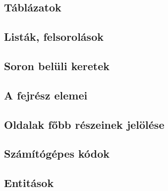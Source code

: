\documentclass[usenames,dvipsnames,aspectratio=169]{beamer}
\begin{document}


\subsection{Táblázatok}



\subsection{Listák, felsorolások}



\subsection{Soron belüli keretek}



\subsection{A fejrész elemei}



\subsection{Oldalak főbb részeinek jelölése}



\subsection{Számítógépes kódok}



\subsection{Entitások}



\end{document}
